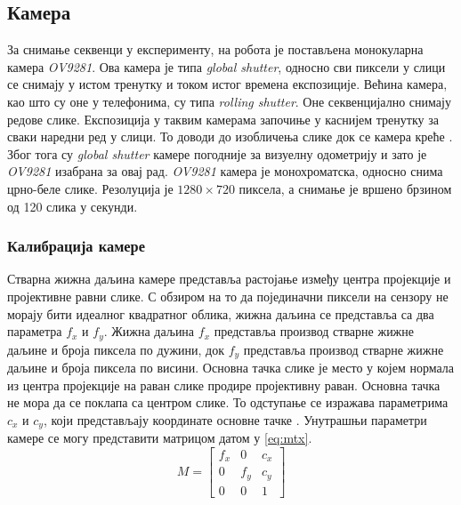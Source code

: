 \documentclass[12pt]{article}
\begin{document}
\subsection{Камера}
За снимање секвенци у експерименту, на робота је постављена монокуларна камера
\textit{OV9281}. Ова камера је типа \textit{global shutter}, односно сви
пиксели у слици се снимају у истом тренутку и током истог времена експозиције.
Већина камера, као што су оне у телефонима, су типа \textit{rolling shutter}.
Оне секвенцијално снимају редове слике. Експозиција у таквим камерама започиње
у каснијем тренутку за сваки наредни ред у слици. То доводи до изобличења слике
док се камера креће \cite{schubert2018drso}. Због тога су \textit{global
	shutter} камере погодније за визуелну одометрију и зато је \textit{OV9281}
изабрана за овај рад. \textit{OV9281} камера је монохроматска, односно снима
црно-беле слике. Резолуција је $1280 \times 720$ пиксела, а снимање је вршено
брзином од 120 слика у секунди.

\subsubsection{Калибрација камере}
Стварна жижна даљина камере представља растојање између центра пројекције и
пројективне равни слике. С обзиром на то да појединачни пиксели на сензору не
морају бити идеалног квадратног облика, жижна даљина се представља са два
параметра $f_x$ и $f_y$. Жижна даљина $f_x$ представља производ стварне жижне
даљине и броја пиксела по дужини, док $f_y$ представља производ стварне жижне
даљине и броја пиксела по висини. Основна тачка слике је место у којем нормала
из центра пројекције на раван слике продире пројективну раван. Основна тачка не
мора да се поклапа са центром слике. То одступање се изражава параметрима $c_x$
и $c_y$, који представљају координате основне тачке \cite{napredna_robotika}.
Унутрашњи параметри камере се могу представити матрицом датом у \eqref{eq:mtx}.
\begin{equation}
	M = \begin{bmatrix} f_x & 0 & c_x\\ 0 & f_y & c_y\\ 0 & 0 & 1 \end{bmatrix}
	\label{eq:mtx}
\end{equation}
\end{document}
